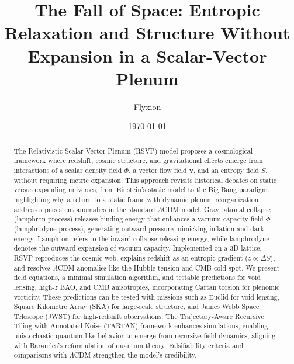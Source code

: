 \documentclass[11pt]{article}
\title{The Fall of Space: Entropic Relaxation and Structure Without Expansion in a Scalar-Vector Plenum}
\author{Flyxion}
\date{\today}
\theoremstyle{plain}
\theoremstyle{definition}
\begin{document}
\maketitle
\begin{abstract}
The Relativistic Scalar-Vector Plenum (RSVP) model proposes a cosmological framework where redshift, cosmic structure, and gravitational effects emerge from interactions of a scalar density field $\Phi$, a vector flow field $\bm{v}$, and an entropy field $S$, without requiring metric expansion. This approach revisits historical debates on static versus expanding universes, from Einstein's static model to the Big Bang paradigm, highlighting why a return to a static frame with dynamic plenum reorganization addresses persistent anomalies in the standard $\Lambda$CDM model. Gravitational collapse (lamphron process) releases binding energy that enhances a vacuum-capacity field $\Phi$ (lamphrodyne process), generating outward pressure mimicking inflation and dark energy. Lamphron refers to the inward collapse releasing energy, while lamphrodyne denotes the outward expansion of vacuum capacity. Implemented on a 3D lattice, RSVP reproduces the cosmic web, explains redshift as an entropic gradient ($z \propto \Delta S$), and resolves $\Lambda$CDM anomalies like the Hubble tension and CMB cold spot. We present field equations, a minimal simulation algorithm, and testable predictions for void lensing, high-$z$ BAO, and CMB anisotropies, incorporating Cartan torsion for plenomic vorticity. These predictions can be tested with missions such as Euclid for void lensing, Square Kilometre Array (SKA) for large-scale structure, and James Webb Space Telescope (JWST) for high-redshift observations. The Trajectory-Aware Recursive Tiling with Annotated Noise (TARTAN) framework enhances simulations, enabling unistochastic quantum-like behavior to emerge from recursive field dynamics, aligning with Barandes's reformulation of quantum theory. Falsifiability criteria and comparisons with $\Lambda$CDM strengthen the model's credibility.
\end{abstract}
\end{document}
